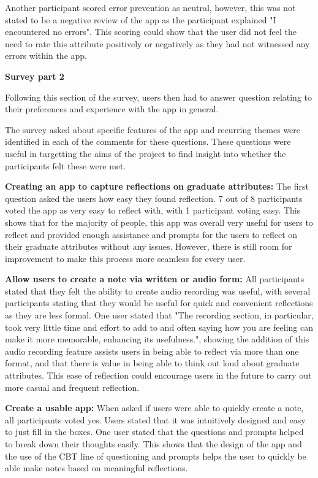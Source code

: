 \documentclass{l4proj}
\begin{document}
Another participant scored error prevention as neutral, however, this was not stated to be a negative review of the app as the participant explained "I encountered no errors". This scoring could show that the user did not feel the need to rate this attribute positively or negatively as they had not witnessed any errors within the app. 
 


\textbf{Survey part 2}
 
Following this section of the survey, users then had to answer question relating to their preferences and experience with the app in general. 

The survey asked about specific features of the app and recurring themes were identified in each of the comments for these questions. These questions were useful in targetting the aims of the project to find insight into whether the participants felt these were met.
 
\textbf{Creating an app to capture reflections on graduate attributes:} The first question asked the users how easy they found reflection. 7 out of 8 participants voted the app as very easy to reflect with, with 1 participant voting easy. This shows that for the majority of people, this app was overall very useful for users to reflect and provided enough assistance and prompts for the users to reflect on their graduate attributes without any issues. However, there is still room for improvement to make this process more seamless for every user.

\textbf{Allow users to create a note via written or audio form:} All participants stated that they felt the ability to create audio recording was useful, with several participants stating that they would be useful for quick and convenient reflections as they are less formal. One user stated that "The recording section, in particular, took very little time and effort to add to and often saying how you are feeling can make it more memorable, enhancing its usefulness.", showing the addition of this audio recording feature assists users in being able to reflect via more than one format, and that there is value in being able to think out loud about graduate attributes. This ease of reflection could encourage users in the future to carry out more casual and frequent reflection. 

\textbf{Create a usable app:} When asked if users were able to quickly create a note, all participants voted yes. Users stated that it was intuitively designed and easy to just fill in the boxes. One user stated that the questions and prompts helped to break down their thoughts easily. This shows that the design of the app and the use of the CBT line of questioning and prompts helps the user to quickly be able make notes based on meaningful reflections. 
\end{document}
